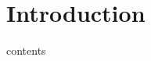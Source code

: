 \documentclass[preprint,12pt]{elsarticle}
\begin{document}
\begin{frontmatter}



\title{}


\author{}

\address{}

\begin{abstract}

\end{abstract}

\begin{keyword}




\end{keyword}

\end{frontmatter}


\section{Introduction}
	contents

	


	


\newpage



\end{document}
